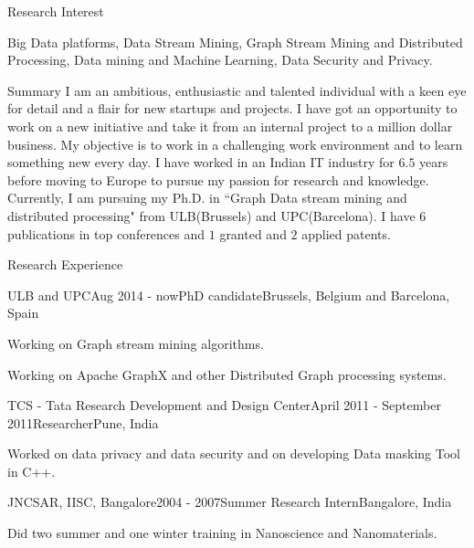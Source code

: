 \documentclass{resume} %
\begin{document}
\begin{rSection}{Research Interest}

Big Data platforms, Data Stream Mining, Graph Stream Mining and Distributed Processing, Data mining and Machine Learning, Data Security and Privacy.

\end{rSection}
\begin{rSection}{Summary}
I am an ambitious, enthusiastic and talented individual with a keen eye for detail and a flair for new startups and projects. I have got an opportunity to work on a new initiative and take it from an internal project to a million dollar business. My objective is to work in a challenging work environment and to learn something new every day. I have worked in an Indian IT industry for $6.5$ years before moving to Europe to pursue my passion for research and knowledge. Currently, I am pursuing my Ph.D. in ``Graph Data stream mining and distributed processing" from ULB(Brussels) and UPC(Barcelona). I have $6$ publications in top conferences and $1$ granted and $2$ applied patents.
\end{rSection}

\begin{rSection}{Research Experience}
\begin{rSubsection}{ULB and UPC}{Aug 2014 - now}{PhD candidate}{Brussels, Belgium and Barcelona, Spain}
\item Working on Graph stream mining algorithms.
\item Working on Apache GraphX and other Distributed Graph processing systems.
\end{rSubsection}
\begin{rSubsection}{TCS - Tata Research Development and Design Center}{April 2011 - September 2011}{Researcher}{Pune, India}
\item Worked on data privacy and data security and on developing Data masking Tool in C++.
\end{rSubsection}

\begin{rSubsection}{JNCSAR, IISC, Bangalore}{2004 - 2007}{Summer Research Intern}{Bangalore, India}
\item Did two summer and one winter training in Nanoscience and Nanomaterials.
\end{rSubsection}
\end{rSection}
\end{document}
